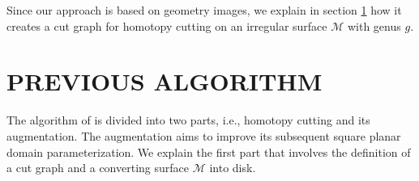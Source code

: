 \documentclass[a4paper,twoside]{article}
\begin{document}
Since our approach is based on geometry images, we explain in section \ref{sec:previous algorithm} how it creates a cut graph for homotopy cutting on an irregular surface $\mathscr{M}$ with genus $g$.
\section{\uppercase{Previous Algorithm}}
\label{sec:previous algorithm}
\noindent The algorithm of \cite{Gu:2002:GI:566654.566589} is divided into two parts, i.e., homotopy cutting and its augmentation. The augmentation aims to improve its subsequent square planar domain parameterization. We explain the first part that involves the definition of a cut graph and a converting surface $\mathscr{M}$ into disk.

\begin{figure}[t]
	\centering		
	\hspace{10pt}
	\hspace{10pt}
	\hspace{10pt}
	\hspace{10pt}		

\end{figure}
\end{document}
